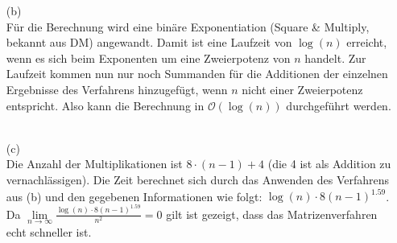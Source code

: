\documentclass[a4paper,11pt,fleqn]{scrartcl}
\begin{document}
\begin{enumerate}
\begin{enumerate}
\begin{enumerate}
					\end{enumerate}\newpage
					
			\item[(b)]\quad \\
			Für die Berechnung wird eine binäre Exponentiation (Square \& Multiply, bekannt aus DM) angewandt.
			Damit ist eine Laufzeit von $\log(n)$ erreicht, wenn es sich beim Exponenten um eine Zweierpotenz
			von	$n$ handelt. Zur Laufzeit kommen nun nur noch Summanden für die Additionen der einzelnen 
			Ergebnisse des Verfahrens hinzugefügt, wenn $n$ nicht einer Zweierpotenz entspricht.
			Also kann die Berechnung in $\mathcal{O}(\log(n))$ durchgeführt werden. \\ \\

			\item[(c)]\quad \\
			Die Anzahl der Multiplikationen ist $8\cdot(n-1)+4$ (die 4 ist als Addition zu vernachlässigen).
			Die Zeit berechnet sich durch das Anwenden des Verfahrens aus (b) und den gegebenen Informationen 
			wie folgt: $\log(n)\cdot 8(n-1)^{1.59}$. \\
			Da $\lim\limits_{n\rightarrow\infty} \frac{\log(n)\cdot 8(n-1)^{1.59}}{n^2} = 0$ gilt ist gezeigt, 
			dass das Matrizenverfahren echt schneller ist.
		\end{enumerate}	
	\end{enumerate}
\end{document}

